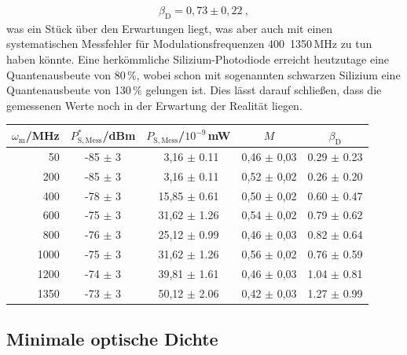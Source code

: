 \begin{gather}
    \boxed{\beta_\mathrm{D} = 0,73 \pm 0,22}~,
\end{gather}
was ein Stück über den Erwartungen liegt, was aber auch mit einen systematischen Messfehler für Modulationsfrequenzen 400~1350\,MHz zu tun haben könnte.
Eine herkömmliche Silizium-Photodiode erreicht heutzutage eine Quantenausbeute von 80\,\%, wobei schon mit sogenannten schwarzen Silizium eine Quantenausbeute von 130\,\% gelungen ist. \cite{siPD} Dies lässt darauf schließen, dass die gemessenen Werte noch in der Erwartung der Realität liegen.
\begin{center}
    \captionsetup{type=table}
    \begin{tabular}{r | c c | c c}
        $\omega_\mathrm{m}$/MHz & $P^*_\mathrm{S,Mess}$/dBm & $P_\mathrm{S,Mess}$/$10^{-9}$\,mW & $M$ & $\beta_\mathrm{D}$\\ \hline
        50   & -85 $\pm$ 3 & ~3,16 $\pm$ 0.11 & 0,46 $\pm$ 0,03 & 0.29 $\pm$ 0.23 \\
        200  & -85 $\pm$ 3 & ~3,16 $\pm$ 0.11 & 0,52 $\pm$ 0,02 & 0.26 $\pm$ 0.20 \\
        400  & -78 $\pm$ 3 & 15,85 $\pm$ 0.61 & 0,50 $\pm$ 0,02 & 0.60 $\pm$ 0.47 \\
        600  & -75 $\pm$ 3 & 31,62 $\pm$ 1.26 & 0,54 $\pm$ 0,02 & 0.79 $\pm$ 0.62 \\
        800  & -76 $\pm$ 3 & 25,12 $\pm$ 0.99 & 0,46 $\pm$ 0,03 & 0.82 $\pm$ 0.64 \\
        1000 & -75 $\pm$ 3 & 31,62 $\pm$ 1.26 & 0,56 $\pm$ 0,02 & 0.76 $\pm$ 0.59 \\
        1200 & -74 $\pm$ 3 & 39,81 $\pm$ 1.61 & 0,46 $\pm$ 0,03 & 1.04 $\pm$ 0.81 \\
        1350 & -73 $\pm$ 3 & 50,12 $\pm$ 2.06 & 0,42 $\pm$ 0,03 & 1.27 $\pm$ 0.99 \\
    \end{tabular}
    \label{tab:ausbeute}
\end{center}










\subsection{Minimale optische Dichte}
\label{sub:minopDichte}

